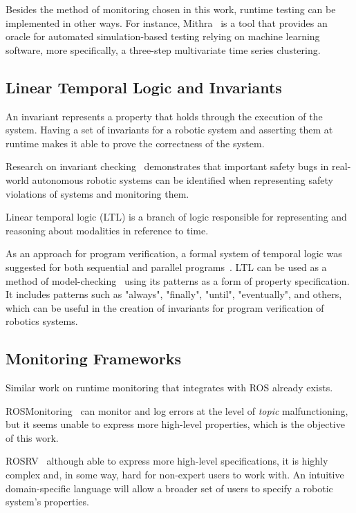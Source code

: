 Besides the method of monitoring chosen in this work, runtime testing can be implemented in other ways. For instance, Mithra~\cite{AfzalMithra} is a tool that provides an oracle for automated simulation-based testing relying on machine learning software, more specifically, a three-step multivariate time series clustering.


\subsection{Linear Temporal Logic and Invariants}
\label{ssec:ltlinvariants}

An invariant represents a property that holds through the execution of the system. Having a set of invariants for a robotic system and asserting them at runtime makes it able to prove the correctness of the system.

Research on invariant checking~\cite{zizyte2021importance} demonstrates that important safety bugs in real-world autonomous robotic systems can be identified when representing safety violations of systems and monitoring them.

Linear temporal logic (LTL) is a branch of logic responsible for representing and reasoning about modalities in reference to time. 

As an approach for program verification, a formal system of temporal logic was suggested for both sequential and parallel programs~\cite{pnueli1977temporal}. LTL can be used as a method of model-checking~\cite{dwyer1998property} using its patterns as a form of property specification. It includes patterns such as "always", "finally", "until", "eventually", and others, which can be useful in the creation of invariants for program verification of robotics systems.


\subsection{Monitoring Frameworks}
\label{ssec:monitoringframeworks}

Similar work on runtime monitoring that integrates with ROS already exists. 

ROSMonitoring~\cite{ferrando2020rosmonitoring} can monitor and log errors at the level of \textit{topic} malfunctioning, but it seems unable to express more high-level properties, which is the objective of this work. 

ROSRV~\cite{huang2014rosrv} although able to express more high-level specifications, it is highly complex and, in some way, hard for non-expert users to work with. An intuitive domain-specific language will allow a broader set of users to specify a robotic system's properties. 

